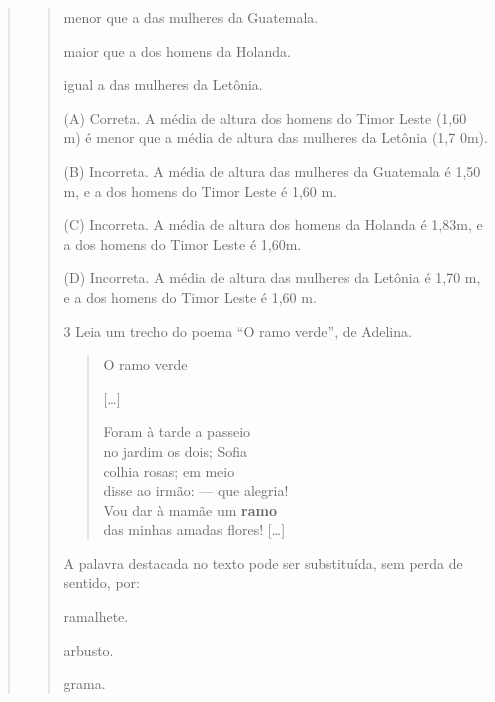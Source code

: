\begin{escolha}
\begin{quote}
\begin{quote}
\begin{escolha}
\item menor que a das mulheres da Guatemala.

\item maior que a dos homens da Holanda.

\item igual a das mulheres da Letônia.
\end{escolha}


(A) Correta. A média de altura dos homens do Timor Leste (1,60 m) é
menor que a média de altura das mulheres da Letônia (1,7 0m).

(B) Incorreta. A média de altura das mulheres da Guatemala é 1,50 m, e a
dos homens do Timor Leste é 1,60 m.

(C) Incorreta. A média de altura dos homens da Holanda é 1,83m, e a dos
homens do Timor Leste é 1,60m.

(D) Incorreta. A média de altura das mulheres da Letônia é 1,70 m, e a
dos homens do Timor Leste é 1,60 m.

\num{3} Leia um trecho do poema ``O ramo verde'', de Adelina.

\begin{verse}
O ramo verde

{[}\ldots{}{]}

Foram à tarde a passeio\\
no jardim os dois; Sofia\\
colhia rosas; em meio\\
disse ao irmão: --- que alegria!\\
Vou dar à mamãe um \textbf{ramo}\\
das minhas amadas flores! {[}\ldots{}{]}
\end{verse}


A palavra destacada no texto pode ser substituída, sem perda de sentido, por:

\begin{escolha}
\item ramalhete.

\item arbusto.

\item grama.


\end{escolha}
\end{quote}
\end{quote}
\end{escolha}
